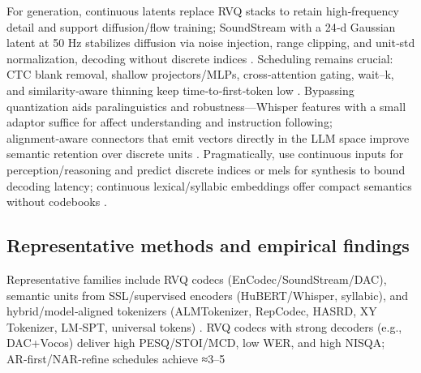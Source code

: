 For generation, continuous latents replace RVQ stacks to retain high‑frequency detail and support diffusion/flow training; SoundStream with a 24‑d Gaussian latent at 50 Hz stabilizes diffusion via noise injection, range clipping, and unit‑std normalization, decoding without discrete indices \cite{yang2025diffsoundstreamefficientspeechtokenizati}. Scheduling remains crucial: CTC blank removal, shallow projectors/MLPs, cross‑attention gating, wait–k, and similarity‑aware thinning keep time‑to‑first‑token low \cite{tsunoo2024decoderonlyarchitecturespeechrecognition,chen2024bestowefficientstreamablespeechlanguagem,xu2025optimaltransportregularizationspeechtext}. Bypassing quantization aids paralinguistics and robustness—Whisper features with a small adaptor suffice for affect understanding and instruction following; alignment‑aware connectors that emit vectors directly in the LLM space improve semantic retention over discrete units \cite{wang2024blspemotowardsempatheticlargespeechlangu,tan2025ssralignmentawaremodalityconnectorspeech}. Pragmatically, use continuous inputs for perception/reasoning and predict discrete indices or mels for synthesis to bound decoding latency; continuous lexical/syllabic embeddings offer compact semantics without codebooks \cite{wang2024c3llmconditionalmultimodalcontentgenerat,yang2025diffsoundstreamefficientspeechtokenizati,tsunoo2024decoderonlyarchitecturespeechrecognition}.

\subsection{Representative methods and empirical findings} \label{subsec:Representative methods and empirical findings}
Representative families include RVQ codecs (EnCodec/SoundStream/DAC), semantic units from SSL/supervised encoders (HuBERT/Whisper, syllabic), and hybrid/model‑aligned tokenizers (ALMTokenizer, RepCodec, HASRD, XY Tokenizer, LM‑SPT, universal tokens) \cite{fily2024establishingdegreesclosenessbetweenaudio,zhang2025impactframeratesspeechtokenizercasestudy,maimon2025salmonsuiteacousticlanguagemodelevaluati}. RVQ codecs with strong decoders (e.g., DAC+Vocos) deliver high PESQ/STOI/MCD, low WER, and high NISQA; AR‑first/NAR‑refine schedules achieve ≈3–5%

